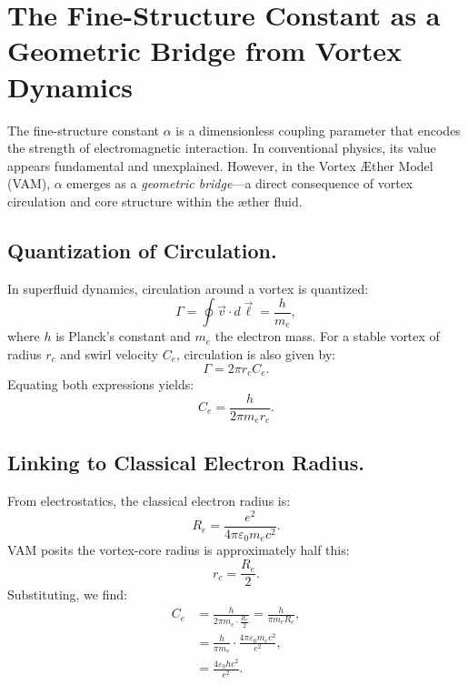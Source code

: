 \section{The Fine-Structure Constant as a Geometric Bridge from Vortex Dynamics}
\label{sec:alpha-geometric-bridge}

The fine-structure constant \( \alpha \) is a dimensionless coupling parameter that encodes the strength of electromagnetic interaction. In conventional physics, its value appears fundamental and unexplained. However, in the Vortex Æther Model (VAM), \( \alpha \) emerges as a \emph{geometric bridge}—a direct consequence of vortex circulation and core structure within the æther fluid.

\subsection*{Quantization of Circulation.}
In superfluid dynamics, circulation around a vortex is quantized:
\begin{equation*}
    \Gamma = \oint \vec{v} \cdot d\vec{\ell} = \frac{h}{m_e},
\end{equation*}
where \( h \) is Planck's constant and \( m_e \) the electron mass. For a stable vortex of radius \( r_c \) and swirl velocity \( C_e \), circulation is also given by:
\begin{equation*}
    \Gamma = 2 \pi r_c C_e.
\end{equation*}
Equating both expressions yields:
\begin{equation*}
    C_e = \frac{h}{2\pi m_e r_c}.
\end{equation*}

\subsection*{Linking to Classical Electron Radius.}
From electrostatics, the classical electron radius is:
\begin{equation*}
    R_e = \frac{e^2}{4\pi \varepsilon_0 m_e c^2}.
\end{equation*}
VAM posits the vortex-core radius is approximately half this:
\begin{equation*}
    r_c = \frac{R_e}{2}.
\end{equation*}
Substituting, we find:
\begin{align}
    C_e &= \frac{h}{2\pi m_e \cdot \frac{R_e}{2}} = \frac{h}{\pi m_e R_e}, \\
    &= \frac{h}{\pi m_e} \cdot \frac{4\pi \varepsilon_0 m_e c^2}{e^2}, \\
    &= \frac{4 \varepsilon_0 h c^2}{e^2}.
\end{align}

